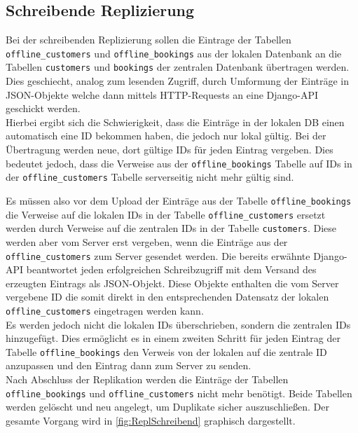 \documentclass[12pt,a4paper,ngerman,english]{report}
\begin{document}
\subsection{Schreibende Replizierung}
\label{subsec:SchrRepl}

Bei der schreibenden Replizierung sollen die Eintrage der Tabellen \texttt{offline\_customers} und \texttt{offline\_bookings} aus der lokalen Datenbank an die Tabellen \texttt{customers} und \texttt{bookings} der zentralen Datenbank übertragen werden. Dies geschiecht, analog zum lesenden Zugriff, durch Umformung der Einträge in JSON-Objekte welche dann mittels HTTP-Requests an eine Django-API geschickt werden.\\

Hierbei ergibt sich die Schwierigkeit, dass die Einträge in der lokalen DB einen automatisch eine ID bekommen haben, die jedoch nur lokal gültig. Bei der Übertragung werden neue, dort gültige IDs für jeden Eintrag vergeben. Dies bedeutet jedoch, dass die Verweise aus der \texttt{offline\_bookings} Tabelle auf IDs in der \texttt{offline\_customers} Tabelle serverseitig nicht mehr gültig sind.\\ 

Es müssen also vor dem Upload der Einträge aus der Tabelle \texttt{offline\_bookings} die Verweise auf die lokalen IDs in der Tabelle \texttt{offline\_customers} ersetzt werden durch Verweise auf die zentralen IDs in der Tabelle \texttt{customers}. Diese werden aber vom Server erst vergeben, wenn die Einträge aus der \texttt{offline\_customers} zum Server gesendet werden. Die bereits erwähnte Django-API beantwortet jeden erfolgreichen Schreibzugriff mit dem Versand des erzeugten Eintrags als JSON-Objekt. Diese Objekte enthalten die vom Server vergebene ID die somit direkt in den entsprechenden Datensatz der lokalen \texttt{offline\_customers} eingetragen werden kann.\\

Es werden jedoch nicht die lokalen IDs überschrieben, sondern die zentralen IDs hinzugefügt. Dies ermöglicht es in einem zweiten Schritt für jeden Eintrag der Tabelle \texttt{offline\_bookings} den Verweis von der lokalen auf die zentrale ID anzupassen und den Eintrag dann zum Server zu senden.\\

Nach Abschluss der Replikation werden die Einträge der Tabellen \texttt{offline\_bookings} und \texttt{offline\_customers} nicht mehr benötigt. Beide Tabellen werden gelöscht und neu angelegt, um Duplikate sicher auszuschließen. Der gesamte Vorgang wird in \autoref{fig:ReplSchreibend} graphisch dargestellt.
\end{document}
